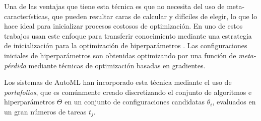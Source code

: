 Una de las ventajas que tiene esta técnica es que no necesita del uso de meta-características, que pueden resultar caras de calcular y difíciles de elegir, lo que lo hace ideal para inicializar procesos costosos de optimización. En uno de estos trabajos usan este enfoque para transferir conocimiento mediante una estrategia de inicialización para la optimización de hiperparámetros \cite{witsuba2015learning}. Las configuraciones iniciales de hiperparámetros son obtenidas optimizando por una función de \textit{meta-pérdida} mediante técnicas de optimización basadas en gradientes.

%

Los sistemas de AutoML han incorporado esta técnica mediante el uso de \textit{portafolios}, que es comúnmente creado discretizando el conjunto de algoritmos e hiperparámetros $\Theta$ en un conjunto de configuraciones candidatas $\theta_i$, evaluados en un gran números de tareas $t_j$.

